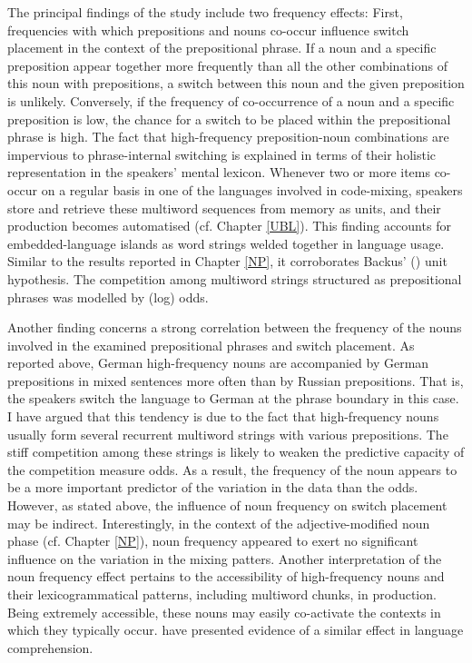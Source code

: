 The principal findings of the study include two frequency effects: First, frequencies with which prepositions and nouns co-occur influence switch placement in the context of the prepositional phrase. If a noun and a specific preposition appear together more frequently than all the other combinations of this noun with prepositions, a switch between this noun and the given preposition is unlikely. Conversely, if the frequency of co-occurrence of a noun and a specific preposition is low, the chance for a switch to be placed within the prepositional phrase is high. The fact that high-frequency preposition-noun combinations are impervious to phrase-internal switching is explained in terms of their holistic representation in the speakers' mental lexicon. Whenever two or more items co-occur on a regular basis in one of the languages involved in code-mixing, speakers store and retrieve these multiword sequences from memory as units, and their production becomes automatised (cf. Chapter \ref{UBL}). This finding accounts for embedded-language islands as word strings welded together in language usage. Similar to the results reported in Chapter \ref{NP}, it  corroborates Backus’ (\citeyear{backus-units-2003}) unit hypothesis. The competition among multiword strings structured as prepositional phrases was modelled by (log) odds. 

Another finding concerns a strong correlation between the frequency of the nouns involved in the examined prepositional phrases and switch placement. As reported above, German high-frequency nouns are accompanied by German prepositions in mixed sentences more often than by Russian prepositions. That is, the speakers switch the language to German at the phrase boundary in this case. I have argued that this tendency is due to the fact that high-frequency nouns usually form several recurrent multiword strings with various prepositions. The stiff competition among these strings is likely to weaken the predictive capacity of the competition measure odds. As a result, the frequency of the noun appears to be a more important predictor of the variation in the data than the odds. However, as stated above, the influence of noun frequency on switch placement may be indirect. Interestingly, in the context of the adjective-modified noun phase (cf. Chapter \ref{NP}), noun frequency appeared to exert no significant influence on the variation in the mixing patters. Another interpretation of the noun frequency effect pertains to the accessibility of high-frequency nouns and their lexicogrammatical patterns, including multiword chunks, in production. Being extremely accessible, these nouns may easily co-activate the contexts in which they typically occur. \cite{arnon-snider} have presented evidence of a similar effect in language comprehension. 

